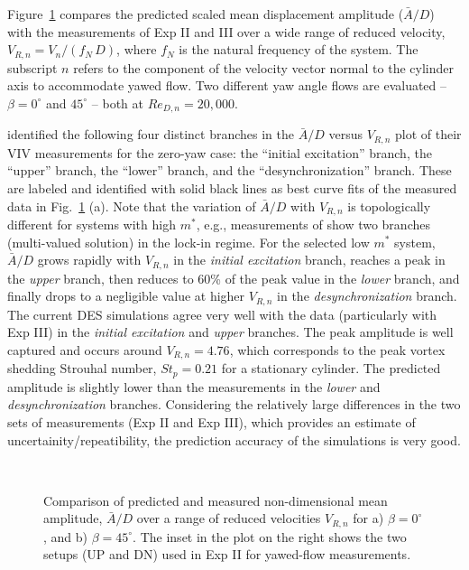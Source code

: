 Figure~\ref{fig:VIV_amp} compares the predicted scaled mean displacement
amplitude ($\bar{A}/D$) with the measurements of Exp II and III over a wide
range of reduced velocity, $V_{R,n} = V_n/(f_N\,D)$, where $f_N$ is the natural
frequency of the system. The subscript $n$ refers to the component of the
velocity vector normal to the cylinder axis to accommodate yawed flow. Two
different yaw angle flows are evaluated -- $\beta=0^\circ$ and $45^\circ$ --
both at $Re_{D,n}=20,000$.

\citet{khalak1997fluid} identified the following four distinct branches in the
$\bar{A}/D$ versus $V_{R,n}$ plot of their VIV measurements for the zero-yaw
case: the ``initial excitation'' branch, the ``upper'' branch, the ``lower''
branch, and the ``desynchronization'' branch. These are labeled and identified
with solid black lines as best curve fits of the measured data in
Fig.~\ref{fig:VIV_amp} (a). Note that the variation of $\bar{A}/D$ with
$V_{R,n}$ is topologically different for systems with high $m^*$, e.g.,
measurements of \citet{feng1968measurement} show two branches (multi-valued
solution) in the lock-in regime. For the selected low $m^*$ system, $\bar{A}/D$
grows rapidly with $V_{R,n}$ in the {\em initial excitation} branch, reaches a
peak in the {\em upper} branch, then reduces to 60\% of the peak value in the
{\em lower} branch, and finally drops to a negligible value at higher $V_{R,n}$
in the {\em desynchronization} branch. The current DES simulations agree very
well with the data (particularly with Exp III) in the {\em initial excitation}
and {\em upper} branches. The peak amplitude is well captured and occurs around
$V_{R,n}=4.76$, which corresponds to the peak vortex shedding Strouhal number,
$St_p=0.21$ for a stationary cylinder. The predicted amplitude is slightly
lower than the measurements in the {\em lower} and {\em desynchronization}
branches.  Considering the relatively large differences in the two sets of
measurements (Exp II and Exp III), which provides an estimate of
uncertainity/repeatibility, the prediction accuracy of the simulations is very
good.
%
\begin{figure}[htb!]
  \centering
   {}
  \qquad
   \\
    \caption{Comparison of predicted and measured non-dimensional mean
      amplitude, $\bar{A}/D$ over a range of reduced velocities $V_{R,n}$ for
      a) $\beta=0^\circ$, and b) $\beta=45^\circ$. The inset in the plot on the
      right shows the two setups (UP and DN) used in Exp II for yawed-flow
      measurements.} 
  \label{fig:VIV_amp}
\end{figure}

